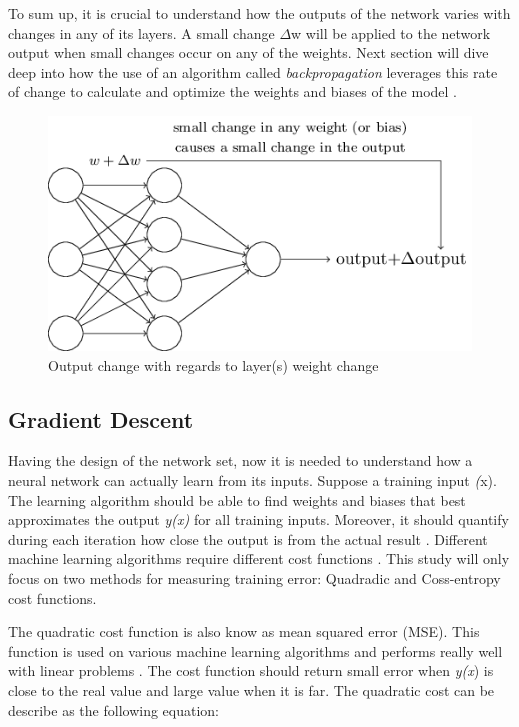 \documentclass{article}
\begin{document}
To sum up, it is crucial to understand how the outputs of the network varies with changes in any of its layers. A small change $\Delta$w will be applied to the network output when small changes occur on any of the weights. Next section will dive deep into how the use of an algorithm called \textit{backpropagation} leverages this rate of change to calculate and optimize the weights and biases of the model \cite{goodfellow2016_book}.
\begin{figure}[h!]
\centering
	\includegraphics[scale=0.7]{net_change.png}
\caption{Output change with regards to layer(s) weight change \cite{nielsen2016}}
\label{fig:net_change}
\end{figure}

\subsection{Gradient Descent}\label{subsec:neural_deep}

Having the design of the network set, now it is needed to understand how a neural network can actually learn from its inputs. Suppose a training input \textit(x). The learning algorithm should be able to find weights and biases that best approximates the output \textit{y(x)} for all training inputs. Moreover, it should quantify during each iteration how close the output is from the actual result \cite{goodfellow2016_book}. Different machine learning algorithms require different cost functions \cite{nielsen2016}. This study will only focus on two methods for measuring training error: Quadradic and Coss-entropy cost functions.

The quadratic cost function is also know as mean squared error (MSE). This function is used on various machine learning algorithms and performs really well with linear problems \cite{nielsen2016}. The cost function should return small error when \textit{y(x}) is close to the real value and large value when it is far. The quadratic cost can be describe as the following equation:
\end{document}
